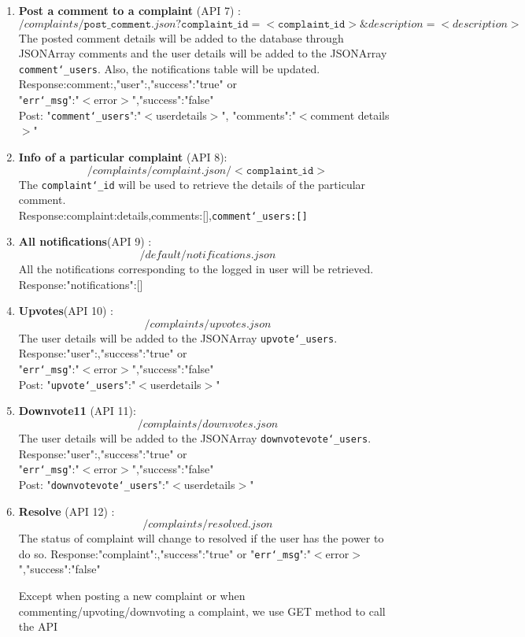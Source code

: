 \documentclass[a4paper]{article}
\begin{document}
\begin{enumerate}
\item \textbf{Post a comment to a complaint} (API 7) :$$ /complaints/\texttt{post\char`_comment}.json?\texttt{complaint\char`_id}=<\texttt{complaint\char`_id}>\&description=<description>$$
The posted comment details will be added to the database through JSONArray comments and the user details will be added to the JSONArray \texttt{comment\char`_users}. Also, the notifications table will be updated.\\
Response:{comment:{},"user":{},"success":"true"} or\\
		{"\texttt{err\char`_msg}":"$<$error$>$","success":"false"} \\
Post: "\texttt{comment\char`_users}":"$<$userdetails$>$", "comments":"$<$comment details$>$" 

\item \textbf{Info of a particular complaint} (API 8): $$/complaints/complaint.json/<\texttt{complaint\char`_id}>$$
The \texttt{complaint\char`_id} will be used to retrieve the details of the particular comment.\\
Response:{complaint:{details},comments:[],\texttt{comment\char`_users:[]}}

\item \textbf{All notifications}(API 9) : $$/default/notifications.json$$
All the notifications corresponding to the logged in user will be retrieved.\\
Response:{"notifications":[]}

\item \textbf{Upvotes}(API 10) : $$/complaints/upvotes.json$$
The user details will be added to the JSONArray \texttt{upvote\char`_users}.\\
Response:{"user":{},"success":"true"} or\\
		{"\texttt{err\char`_msg}":"$<$error$>$","success":"false"}\\
Post: "\texttt{upvote\char`_users}":"$<$userdetails$>$"

\item \textbf{Downvote11} (API 11): $$/complaints/downvotes.json$$
The user details will be added to the JSONArray \texttt{downvotevote\char`_users}.\\
Response:{"user":{},"success":"true"} or \\
		{"\texttt{err\char`_msg}":"$<$error$>$","success":"false"} \\
Post: "\texttt{downvotevote\char`_users}":"$<$userdetails$>$"

\item \textbf{Resolve} (API 12) : $$/complaints/resolved.json$$
The status of complaint will change to resolved if the user has the power to do so.
Response:{"complaint":{},"success":"true"} or
		{"\texttt{err\char`_msg}":"$<$error$>$","success":"false"}

Except when posting a new complaint or when commenting/upvoting/downvoting a complaint, we use GET method to call the API




\end{enumerate}
\end{document}
